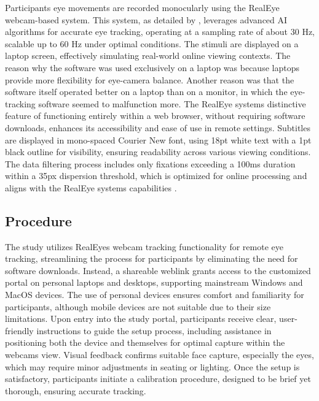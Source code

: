 Participants\textquotesingle{} eye movements are recorded monocularly
using the RealEye webcam-based system. This system, as detailed by
\textcite{lewandowska2019}, leverages advanced AI algorithms for accurate eye
tracking, operating at a sampling rate of about 30 Hz, scalable up to 60
Hz under optimal conditions. The stimuli are displayed on a laptop
screen, effectively simulating real-world online viewing contexts. The
reason why the software was used exclusively on a laptop was because
laptops provide more flexibility for eye-camera balance. Another reason
was that the software itself operated better on a laptop than on a
monitor, in which the eye-tracking software seemed to malfunction more.
The RealEye system\textquotesingle s distinctive feature of functioning
entirely within a web browser, without requiring software downloads,
enhances its accessibility and ease of use in remote settings. Subtitles
are displayed in mono-spaced Courier New font, using 18pt white text
with a 1pt black outline for visibility, ensuring readability across
various viewing conditions. The data filtering process includes only
fixations exceeding a 100ms duration within a 35px dispersion threshold,
which is optimized for online processing and aligns with the RealEye
system\textquotesingle s capabilities \cite{lewandowska2019}.

\subsection{Procedure}\label{sub-sec-procedure}

The study utilizes RealEye\textquotesingle s webcam tracking
functionality for remote eye tracking, streamlining the process for
participants by eliminating the need for software downloads. Instead, a
shareable weblink grants access to the customized portal on personal
laptops and desktops, supporting mainstream Windows and MacOS devices.
The use of personal devices ensures comfort and familiarity for
participants, although mobile devices are not suitable due to their size
limitations. Upon entry into the study portal, participants receive
clear, user-friendly instructions to guide the setup process, including
assistance in positioning both the device and themselves for optimal
capture within the webcam\textquotesingle s view. Visual feedback
confirms suitable face capture, especially the eyes, which may require
minor adjustments in seating or lighting. Once the setup is
satisfactory, participants initiate a calibration procedure, designed to
be brief yet thorough, ensuring accurate tracking.

